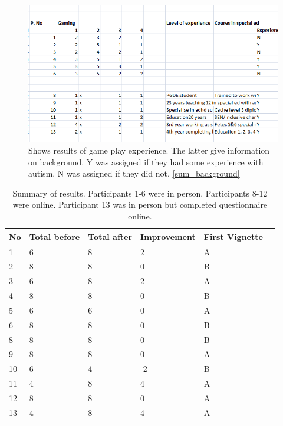 \begin{figure}[H]
\centering
\includegraphics[scale=0.7]{images/appendix/summative_resultsgameexperience.png}
\caption{Shows results of game play experience. The latter give information on background. Y was assigned if they had some experience with autism. N was assigned if they did not. \ref{sum_background}}
\end{figure}

\begin{table}[H]
    \begin{tabular}{| p{1cm} | p{2cm} | p{2cm} | p{3cm} | p{3cm} | p{3cm} |}
    \hline
    \textbf{No} & \textbf{Total before} & \textbf{Total after} & \textbf{Improvement} & \textbf{First Vignette}  \\                                                                                                                                                                                    
	\hline
	1 & 6 & 8 & 2 & A  \\ \hline
	2 & 8 & 8 & 0 & B  \\ \hline
	3 & 6 & 8 & 2 & A  \\ \hline
	4 & 8 & 8 & 0 & B  \\ \hline
	5 & 6 & 6 & 0 & A  \\ \hline
	6 & 8 & 8 & 0 & B \\ \hline
	
	8 & 8 & 8 & 0 & B \\ \hline
	9 & 8 & 8 & 0 & A  \\ \hline
	10 & 6 & 4 & -2 & B  \\ \hline
	11 & 4 & 8 & 4 & A  \\ \hline
	12 & 8 & 8 & 0 & A  \\ \hline
	13 & 4 & 8 & 4 & A  \\ \hline
    \hline
    \end{tabular}
    \caption{Summary of results. Participants 1-6 were in person. Participants 8-12 were online. Participant 13 was in person but completed questionnaire online.}
\end{table}

